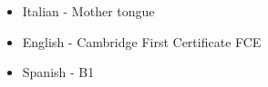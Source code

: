 


\begin{itemize}
    \item Italian - Mother tongue
    \item English - Cambridge First Certificate FCE
    \item Spanish - B1
\end{itemize}


